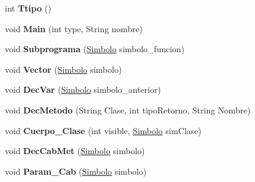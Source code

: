 \begin{DoxyCompactItemize}
\item 
\hypertarget{classcompilationunit_1_1_parser_af2d02167be2376ed4c12efdf87b35cc9}{
int {\bfseries Ttipo} ()}
\label{classcompilationunit_1_1_parser_af2d02167be2376ed4c12efdf87b35cc9}

\item 
\hypertarget{classcompilationunit_1_1_parser_a0f65f0e9b8dc18f594c477c72730511d}{
void {\bfseries Main} (int type, String nombre)}
\label{classcompilationunit_1_1_parser_a0f65f0e9b8dc18f594c477c72730511d}

\item 
\hypertarget{classcompilationunit_1_1_parser_a9ecda0bee883ffa7d2a61ef613f73071}{
void {\bfseries Subprograma} (\hyperlink{classcompilationunit_1_1_simbolo}{Simbolo} simbolo\_\-funcion)}
\label{classcompilationunit_1_1_parser_a9ecda0bee883ffa7d2a61ef613f73071}

\item 
\hypertarget{classcompilationunit_1_1_parser_ac645346a6878110ba9794e6af75dc131}{
void {\bfseries Vector} (\hyperlink{classcompilationunit_1_1_simbolo}{Simbolo} simbolo)}
\label{classcompilationunit_1_1_parser_ac645346a6878110ba9794e6af75dc131}

\item 
\hypertarget{classcompilationunit_1_1_parser_adfc0bf2974477f0e3becd76e0246fbc5}{
void {\bfseries DecVar} (\hyperlink{classcompilationunit_1_1_simbolo}{Simbolo} simbolo\_\-anterior)}
\label{classcompilationunit_1_1_parser_adfc0bf2974477f0e3becd76e0246fbc5}

\item 
\hypertarget{classcompilationunit_1_1_parser_a6386263c262af9376bdcfa352cb56034}{
void {\bfseries DecMetodo} (String Clase, int tipoRetorno, String Nombre)}
\label{classcompilationunit_1_1_parser_a6386263c262af9376bdcfa352cb56034}

\item 
\hypertarget{classcompilationunit_1_1_parser_a7fdd0d044cbb98f9574e3b93391c2b85}{
void {\bfseries Cuerpo\_\-Clase} (int visible, \hyperlink{classcompilationunit_1_1_simbolo}{Simbolo} simClase)}
\label{classcompilationunit_1_1_parser_a7fdd0d044cbb98f9574e3b93391c2b85}

\item 
\hypertarget{classcompilationunit_1_1_parser_ab7eb09da8cf2ad362f150d5b8702170c}{
void {\bfseries DecCabMet} (\hyperlink{classcompilationunit_1_1_simbolo}{Simbolo} simbolo)}
\label{classcompilationunit_1_1_parser_ab7eb09da8cf2ad362f150d5b8702170c}

\item 
\hypertarget{classcompilationunit_1_1_parser_a2078f77c3e5658f8fac7956975c472ce}{
void {\bfseries Param\_\-Cab} (\hyperlink{classcompilationunit_1_1_simbolo}{Simbolo} simbolo)}
\label{classcompilationunit_1_1_parser_a2078f77c3e5658f8fac7956975c472ce}


\end{DoxyCompactItemize}
